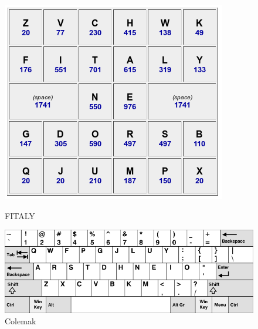 \documentclass[times, utf8, zavrsni]{fer}
\begin{document}
\begin{figure}[htb]
  \centering
  \begin{minipage}[b]{0.45\textwidth}
    \includegraphics[width=\textwidth]{img/fitaly.png}
    \caption{FITALY}
    \label{fig:fitaly}
  \end{minipage}
  \hfill
  \begin{minipage}[b]{0.45\textwidth}
    \includegraphics[width=\textwidth]{img/colemak.png}
    \caption{Colemak}
    \label{fig:colemak}
  \end{minipage}
\end{figure}
\end{document}
